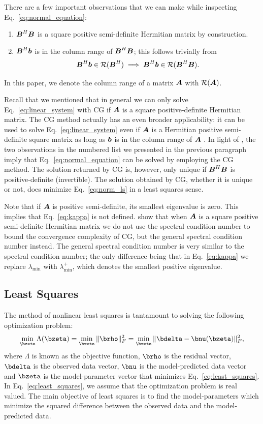 \documentclass[useAMS,usenatbib]{mn2e}
\newcommand{\bA}{\bmath{A}}
\newcommand{\bB}{\bmath{B}}
\newcommand{\bb}{\bmath{b}}
\begin{document}
There are a few important observations that we can make while inspecting Eq.~\eqref{eq:normal_equation}:
\begin{enumerate}
\item $\bB^H\bB$ is a square positive semi-definite Hermitian matrix by construction.
\item $\bB^H\bb$ is in the column range of $\bB^H\bB$; this follows trivially from 
\begin{equation}
\bB^H\bb \in \mathcal{R}(\bB^H) \implies \bB^H\bb \in \mathcal{R}(\bB^H\bB).   
\end{equation}
\end{enumerate}
In this paper, we denote the column range of a matrix $\bA$ with $\mathcal{R}(\bA)$.

Recall that we mentioned that in general we can only solve Eq.~\eqref{eq:linear_system} with CG if $\bA$ is a square positive-definite Hermitian matrix. The CG method actually has an even broader applicability: it can be used to solve Eq.~\eqref{eq:linear_system} even if $\bA$ is a Hermitian positive semi-definite
square matrix as long as $\bb$ is in the column range of $\bA$ \citep{Lu2015}. In light of \citet{Lu2015}, the two observations in the numbered list we presented in the previous paragraph imply that Eq.~\eqref{eq:normal_equation}
can be solved by employing the CG method. The solution returned by CG is, however, only unique if $\bB^H\bB$ is positive-definite (invertible). The solution
obtained by CG, whether it is unique or not, does minimize Eq.~\eqref{eq:norm_ls} in a least squares sense.

Note that if $\bA$ is positive semi-definite, its smallest eigenvalue is zero. This implies that Eq.~\eqref{eq:kappa} is not defined. \citet{Lu2015} show that when $\bA$
is a square positive semi-definite Hermitian matrix we do not use the spectral condition number to bound the convergence complexity of CG, but the general spectral condition
number instead. The general spectral condition number is very similar to the spectral condition number; the only difference being that in Eq.~\eqref{eq:kappa} we replace  
$\lambda_{\textrm{min}}$ with $\lambda_{\textrm{min}}^+$, which denotes the smallest positive eigenvalue. 

\subsection{Least Squares}
\label{sec:ls}
The method of nonlinear least squares is tantamount to solving the following optimization problem:  
\begin{equation}
\label{eq:least_squares}
\min_{\bzeta} \Lambda(\bzeta) = \min_{\bzeta} \|\brho\|_F^2 = \min_{\bzeta} \|\bdelta - \bnu(\bzeta)\|_F^2, 
\end{equation}
where $\Lambda$ is known as the objective function, $\brho$ is the residual vector, $\bdelta$ is the observed data vector, $\bnu$ is the model-predicted data vector and $\bzeta$ is the model-parameter vector that minimizes Eq.~\eqref{eq:least_squares}.
In Eq.~\eqref{eq:least_squares}, we assume that the optimization problem is real valued.
The main objective of least squares is to find the model-parameters which minimize the squared difference between the observed data and the model-predicted data.
\end{document}
